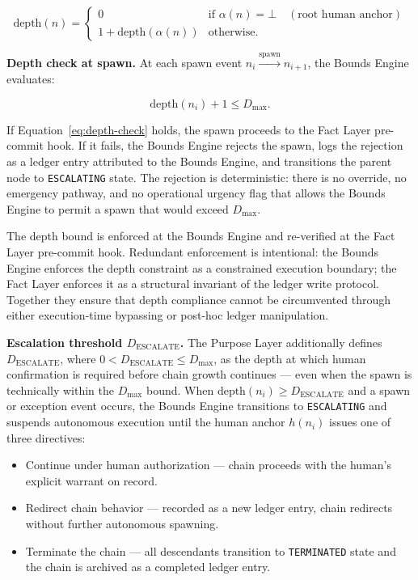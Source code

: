 \begin{equation}
\text{depth}(n) =
\begin{cases}
0 & \text{if } \alpha(n) = \bot \quad (\text{root human anchor}) \\[6pt]
1 + \text{depth}(\alpha(n)) & \text{otherwise}.
\end{cases}
\label{eq:chain-depth}
\end{equation}

\medskip
\noindent\textbf{Depth check at spawn.} At each spawn event $n_i \xrightarrow{\text{spawn}} n_{i+1}$, the Bounds Engine evaluates:

\begin{equation}
\text{depth}(n_i) + 1 \leq D_{\max}.
\label{eq:depth-check}
\end{equation}

If Equation~\ref{eq:depth-check} holds, the spawn proceeds to the Fact Layer pre-commit hook. If it fails, the Bounds Engine rejects the spawn, logs the rejection as a ledger entry attributed to the Bounds Engine, and transitions the parent node to \texttt{ESCALATING} state. The rejection is deterministic: there is no override, no emergency pathway, and no operational urgency flag that allows the Bounds Engine to permit a spawn that would exceed $D_{\max}$.

The depth bound is enforced at the Bounds Engine and re-verified at the Fact Layer pre-commit hook. Redundant enforcement is intentional: the Bounds Engine enforces the depth constraint as a constrained execution boundary; the Fact Layer enforces it as a structural invariant of the ledger write protocol. Together they ensure that depth compliance cannot be circumvented through either execution-time bypassing or post-hoc ledger manipulation.

\medskip
\noindent\textbf{Escalation threshold $D_{\text{ESCALATE}}$.} The Purpose Layer additionally defines $D_{\text{ESCALATE}}$, where $0 < D_{\text{ESCALATE}} \leq D_{\max}$, as the depth at which human confirmation is required before chain growth continues — even when the spawn is technically within the $D_{\max}$ bound. When $\text{depth}(n_i) \geq D_{\text{ESCALATE}}$ and a spawn or exception event occurs, the Bounds Engine transitions to \texttt{ESCALATING} and suspends autonomous execution until the human anchor $h(n_i)$ issues one of three directives:

\begin{itemize}
    \item[\texttt{ACK}] Continue under human authorization — chain proceeds with the human's explicit warrant on record.
    \item[\texttt{RESOLVE}] Redirect chain behavior — recorded as a new ledger entry, chain redirects without further autonomous spawning.
    \item[\texttt{REJECT}] Terminate the chain — all descendants transition to \texttt{TERMINATED} state and the chain is archived as a completed ledger entry.
\end{itemize}

